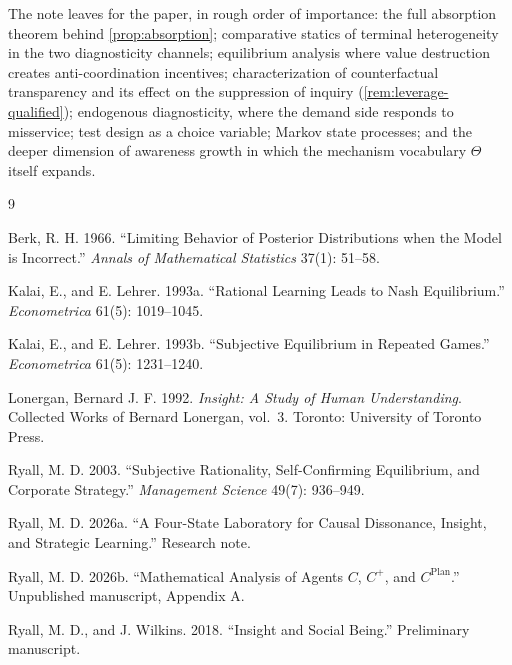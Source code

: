 \documentclass[11pt]{article}
\begin{document}
The note leaves for the paper, in rough order of importance: the full
absorption theorem behind \cref{prop:absorption}; comparative statics of
terminal heterogeneity in the two diagnosticity channels; equilibrium
analysis where value destruction creates anti-coordination incentives;
characterization of counterfactual transparency and its effect on the
suppression of inquiry (\cref{rem:leverage-qualified}); endogenous
diagnosticity, where the demand side responds to misservice; test design as a
choice variable; Markov state processes; and the deeper dimension of
awareness growth in which the mechanism vocabulary $\Theta$ itself expands.

\begin{thebibliography}{9}

Berk, R. H. 1966.
\newblock ``Limiting Behavior of Posterior Distributions when the Model is
Incorrect.''
\newblock \emph{Annals of Mathematical Statistics} 37(1): 51--58.

Kalai, E., and E. Lehrer. 1993a.
\newblock ``Rational Learning Leads to Nash Equilibrium.''
\newblock \emph{Econometrica} 61(5): 1019--1045.

Kalai, E., and E. Lehrer. 1993b.
\newblock ``Subjective Equilibrium in Repeated Games.''
\newblock \emph{Econometrica} 61(5): 1231--1240.

Lonergan, Bernard J. F. 1992.
\newblock \emph{Insight: A Study of Human Understanding}.
\newblock Collected Works of Bernard Lonergan, vol.~3. Toronto: University of
Toronto Press.

Ryall, M. D. 2003.
\newblock ``Subjective Rationality, Self-Confirming Equilibrium, and Corporate
Strategy.''
\newblock \emph{Management Science} 49(7): 936--949.

Ryall, M. D. 2026a.
\newblock ``A Four-State Laboratory for Causal Dissonance, Insight, and
Strategic Learning.''
\newblock Research note.

Ryall, M. D. 2026b.
\newblock ``Mathematical Analysis of Agents $C$, $C^{+}$, and
$C^{\mathrm{Plan}}$.''
\newblock Unpublished manuscript, Appendix A.

Ryall, M. D., and J. Wilkins. 2018.
\newblock ``Insight and Social Being.''
\newblock Preliminary manuscript.

\end{thebibliography}
\end{document}
